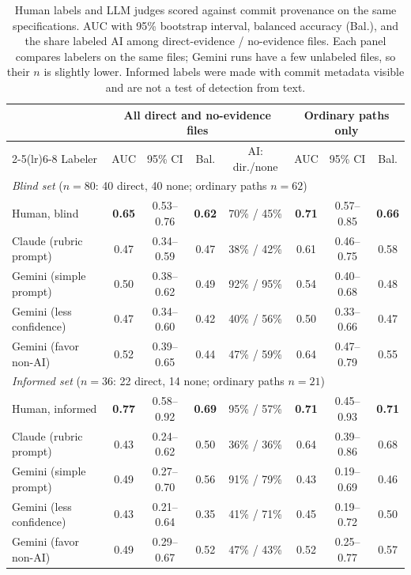 \documentclass{article}
\begin{document}
\begin{table}[ht]
\centering
\small
\caption{Human labels and LLM judges scored against commit provenance on the same specifications. AUC with 95\% bootstrap interval, balanced accuracy (Bal.), and the share labeled AI among direct-evidence / no-evidence files. Each panel compares labelers on the same files; Gemini runs have a few unlabeled files, so their $n$ is slightly lower. Informed labels were made with commit metadata visible and are not a test of detection from text.}
\label{tab:blind-human}
\begin{tabular}{lccccccc}
\toprule
& \multicolumn{4}{c}{All direct and no-evidence files} & \multicolumn{3}{c}{Ordinary paths only} \\
\cmidrule(lr){2-5}\cmidrule(lr){6-8}
Labeler & AUC & 95\% CI & Bal. & AI: dir./none & AUC & 95\% CI & Bal. \\
\midrule
\multicolumn{8}{l}{\emph{Blind set} ($n=80$: 40 direct, 40 none; ordinary paths $n=62$)} \\
Human, blind & \textbf{0.65} & 0.53--0.76 & \textbf{0.62} & 70\% / 45\% & \textbf{0.71} & 0.57--0.85 & \textbf{0.66} \\
Claude (rubric prompt) & 0.47 & 0.34--0.59 & 0.47 & 38\% / 42\% & 0.61 & 0.46--0.75 & 0.58 \\
Gemini (simple prompt) & 0.50 & 0.38--0.62 & 0.49 & 92\% / 95\% & 0.54 & 0.40--0.68 & 0.48 \\
Gemini (less confidence) & 0.47 & 0.34--0.60 & 0.42 & 40\% / 56\% & 0.50 & 0.33--0.66 & 0.47 \\
Gemini (favor non-AI) & 0.52 & 0.39--0.65 & 0.44 & 47\% / 59\% & 0.64 & 0.47--0.79 & 0.55 \\
\midrule
\multicolumn{8}{l}{\emph{Informed set} ($n=36$: 22 direct, 14 none; ordinary paths $n=21$)} \\
Human, informed & \textbf{0.77} & 0.58--0.92 & \textbf{0.69} & 95\% / 57\% & \textbf{0.71} & 0.45--0.93 & \textbf{0.71} \\
Claude (rubric prompt) & 0.43 & 0.24--0.62 & 0.50 & 36\% / 36\% & 0.64 & 0.39--0.86 & 0.68 \\
Gemini (simple prompt) & 0.49 & 0.27--0.70 & 0.56 & 91\% / 79\% & 0.43 & 0.19--0.69 & 0.46 \\
Gemini (less confidence) & 0.43 & 0.21--0.64 & 0.35 & 41\% / 71\% & 0.45 & 0.19--0.72 & 0.50 \\
Gemini (favor non-AI) & 0.49 & 0.29--0.67 & 0.52 & 47\% / 43\% & 0.52 & 0.25--0.77 & 0.57 \\
\bottomrule
\end{tabular}
\end{table}
\end{document}
